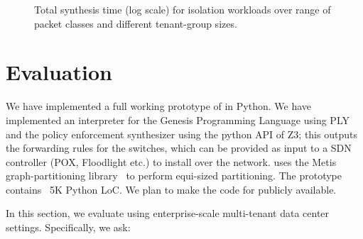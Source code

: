 \begin{figure*}
	\centering
	\caption{\label{fig:isolation}
		Total synthesis time (log scale) for isolation workloads over range of packet classes and different tenant-group sizes.}
\end{figure*}

\section{Evaluation}

 We have implemented a full working
prototype of \Name in Python. We have implemented an interpreter for
the Genesis Programming Language using PLY\cite{ply} and the policy
enforcement synthesizer using the python API of Z3; this outputs the
forwarding rules for the switches, which can be provided as input to a
SDN controller (POX, Floodlight etc.) to install over the
network. \Name uses the Metis graph-partitioning library~\cite{metis}
to perform equi-sized partitioning.  The prototype contains ~5K Python LoC.  
We plan to make the code for \Name publicly available.

In this section, we evaluate \Name using
enterprise-scale multi-tenant data
center settings. 
Specifically, we ask:

